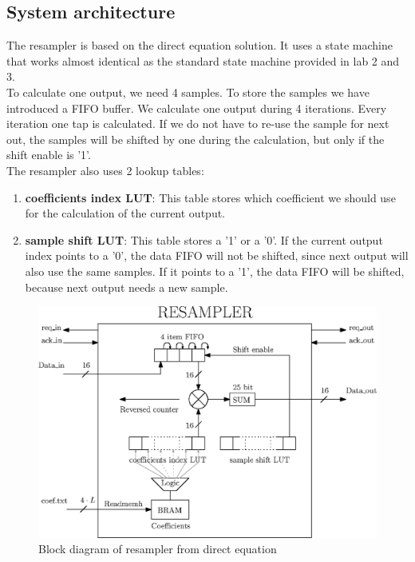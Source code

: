\documentclass[a4paper,twoside,11pt, fleqn]{article}
\begin{document}
\newpage
\subsection{System architecture}
The resampler is based on the direct equation solution. It uses a state machine that works almost identical as the standard state machine provided in lab 2 and 3. \\

To calculate one output, we need 4 samples. To store the samples we have introduced a FIFO buffer. We calculate one output during 4 iterations.  Every iteration one tap is calculated. If we do not have to re-use the sample for next out, the samples will be shifted by one during the calculation, but only if the shift enable is '1'.\\

The resampler also uses 2 lookup tables:
\begin{enumerate}
\item \textbf{coefficients index LUT}: This table stores which coefficient we should use for the calculation of the current output.
\item \textbf{sample shift LUT}: This table stores a '1' or a '0'. If the current output index points to a '0', the data FIFO will not be shifted, since next output will also use the same samples. If it points to a '1', the data FIFO  will be shifted, because next output needs a new sample.
\end{enumerate}

\begin{figure}[h]
	\includegraphics[scale = 1]{Images/4_blockdiagram}
    \caption{Block diagram of resampler from direct equation}
\end{figure}
\end{document}
